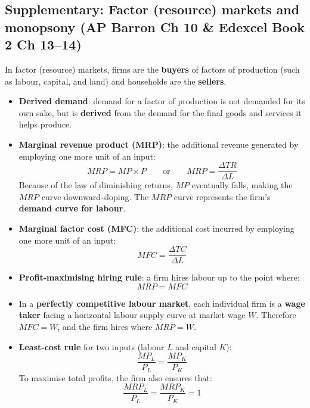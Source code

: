 \documentclass[a4paper,12pt]{article}
\newcommand{\needbold}[1]{\textcolor{red!70!black}{\textbf{#1}}}
\begin{document}
\subsection{Supplementary: Factor (resource) markets and monopsony (AP Barron Ch 10 \& Edexcel Book 2 Ch 13--14)}
In factor (resource) markets, firms are the \textbf{buyers} of factors of production (such as labour, capital, and land) and households are the \textbf{sellers}.
\begin{itemize}
  \item \needbold{Derived demand}: demand for a factor of production is not demanded for its own sake, but is \textbf{derived} from the demand for the final goods and services it helps produce.
  \item \needbold{Marginal revenue product (MRP)}: the additional revenue generated by employing one more unit of an input:
  \[MRP = MP \times P \qquad \text{or} \qquad MRP = \dfrac{\Delta TR}{\Delta L}\]
  Because of the law of diminishing returns, $MP$ eventually falls, making the $MRP$ curve downward-sloping. The $MRP$ curve represents the firm's \textbf{demand curve for labour}.
  \item \needbold{Marginal factor cost (MFC)}: the additional cost incurred by employing one more unit of an input:
  \[MFC = \dfrac{\Delta TC}{\Delta L}\]
  \item \textbf{Profit-maximising hiring rule}: a firm hires labour up to the point where:
  \[MRP = MFC\]
  \item In a \textbf{perfectly competitive labour market}, each individual firm is a \textbf{wage taker} facing a horizontal labour supply curve at market wage $W$. Therefore $MFC = W$, and the firm hires where $MRP = W$.
  \item \textbf{Least-cost rule} for two inputs (labour $L$ and capital $K$):
  \[\dfrac{MP_L}{P_L} = \dfrac{MP_K}{P_K}\]
  To maximise total profits, the firm also ensures that:
  \[\dfrac{MRP_L}{P_L} = \dfrac{MRP_K}{P_K} = 1\]
\end{itemize}
\end{document}
